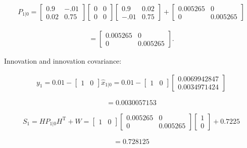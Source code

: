 \[\begin{aligned}
P_{1|0} = \begin{bmatrix} 0.9 &-.01 \\0.02 &0.75\end{bmatrix}\begin{bmatrix}0 & 0\\ 0&0\end{bmatrix} \begin{bmatrix} 0.9 &0.02 \\ -.01&0.75\end{bmatrix} +\begin{bmatrix} 0.005265&0\\0& 0.005265\end{bmatrix}
\end{aligned}\]

\[\begin{aligned}
= \begin{bmatrix} 0.005265&0\\0& 0.005265\end{bmatrix}.
\end{aligned}\]

Innovation and innovation covariance:

\[\begin{aligned}
y_1 = 0.01 - \begin{bmatrix} 1& 0 \end{bmatrix}\hat{x}_{1|0} = 0.01 - \begin{bmatrix} 1& 0 \end{bmatrix}\begin{bmatrix} 0.0069942847\\  0.0034971424\end{bmatrix}
\end{aligned}\]

\[= 0.0030057153\]

\[\begin{aligned}
S_1 = HP_{1|0} H^\text{T} + W = \begin{bmatrix} 1 & 0\end{bmatrix} \begin{bmatrix} 0.005265&0\\0& 0.005265\end{bmatrix}\begin{bmatrix} 1\\0\end{bmatrix} + 0.7225
\end{aligned}\]

\[=0.728125\]

